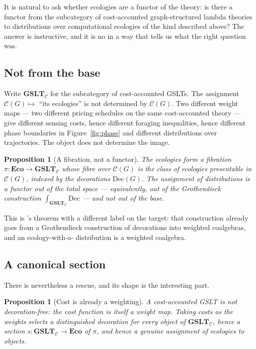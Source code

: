\documentclass[11pt]{article}
\theoremstyle{plain}
\newtheorem{proposition}[theorem]{Proposition}
\theoremstyle{definition}
\newcommand{\CGSLT}{\mathbf{GSLT}_{\mathcal{C}}}
\newcommand{\Eco}{\mathbf{Eco}}
\newcommand{\Dec}{\mathrm{Dec}}
\begin{document}
It is natural to ask whether ecologies are a functor of the theory: is there a functor from the
subcategory of cost-accounted graph-structured lambda theories to distributions over computational
ecologies of the kind described above? The answer is instructive, and it is no in a way that tells us
what the right question was.

\subsection{Not from the base}

Write $\CGSLT$ for the subcategory of cost-accounted GSLTs. The assignment
$\mathcal{C}(G) \mapsto$ ``its ecologies'' is not determined by $\mathcal{C}(G)$. Two different weight
maps --- two different pricing schedules on the same cost-accounted theory --- give different sensing
costs, hence different foraging inequalities, hence different phase boundaries in
Figure~\ref{fig:phase} and different distributions over trajectories. The object does not determine
the image.

\begin{proposition}[A fibration, not a functor]
\label{prop:fibration}
The ecologies form a fibration $\pi : \Eco \to \CGSLT$ whose fibre over $\mathcal{C}(G)$ is the class
of ecologies presentable in $\mathcal{C}(G)$, indexed by the decorations $\Dec(G)$. The assignment of
distributions is a functor out of the total space --- equivalently, out of the Grothendieck
construction $\textstyle\int_{\CGSLT} \Dec$ --- and not out of the base.
\end{proposition}

This is \cite{StochSim}'s theorem with a different label on the target: that construction already goes
from a Grothendieck construction of decorations into weighted coalgebras, and an ecology-with-a-
distribution is a weighted coalgebra.

\subsection{A canonical section}

There is nevertheless a rescue, and its shape is the interesting part.

\begin{proposition}[Cost is already a weighting]
\label{prop:section}
A cost-accounted GSLT is not decoration-free: the cost function is itself a weight map. Taking costs
as the weights selects a distinguished decoration for every object of $\CGSLT$, hence a section
$s : \CGSLT \to \Eco$ of $\pi$, and hence a genuine assignment of ecologies to objects.
\end{proposition}
\end{document}
